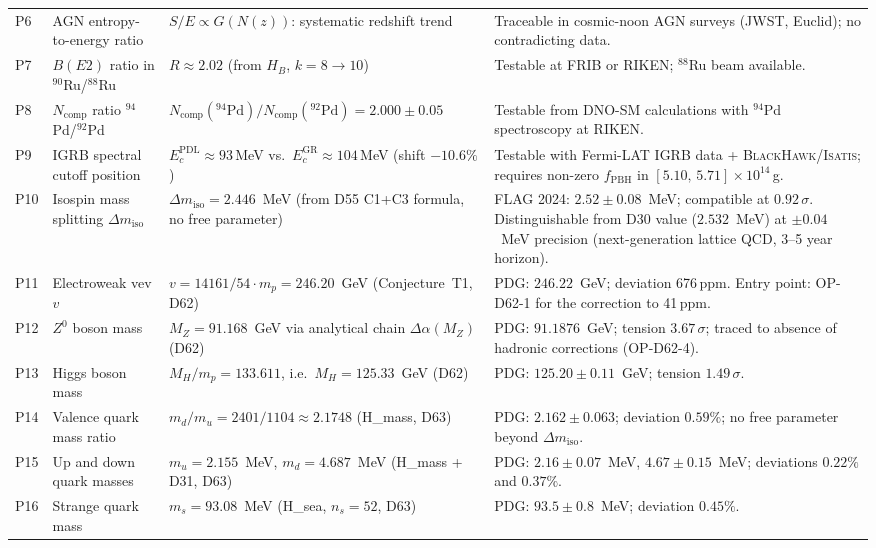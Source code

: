 \documentclass[11pt,a4paper]{article}
\theoremstyle{plain}
\theoremstyle{definition}
\theoremstyle{remark}
\begin{document}
\begin{longtable}{L{0.5cm}L{3.2cm}L{5.2cm}L{4.2cm}}
P6 & AGN entropy-to-energy ratio & $S/E\propto G(N(z))$: systematic redshift trend & Traceable in cosmic-noon AGN surveys (JWST, Euclid); no contradicting data.\\[0.4em]
P7 & $B(E2)$ ratio in $^{90}$Ru/$^{88}$Ru & $R\approx 2.02$ (from $H_B$, $k=8\to10$) & Testable at FRIB or RIKEN; $^{88}$Ru beam available.\\[0.4em]
P8 & $N_{\mathrm{comp}}$ ratio $^{94}$Pd/$^{92}$Pd & $N_{\mathrm{comp}}(^{94}\mathrm{Pd})/N_{\mathrm{comp}}(^{92}\mathrm{Pd})=2.000\pm0.05$ & Testable from DNO-SM calculations with $^{94}$Pd spectroscopy at RIKEN.\\[0.4em]
P9 & IGRB spectral cutoff position & $E_c^{\mathrm{PDL}} \approx 93$\,MeV vs.\ $E_c^{\mathrm{GR}} \approx 104$\,MeV (shift $-10.6\%$) & Testable with Fermi-LAT IGRB data + \textsc{BlackHawk}/\textsc{Isatis}; requires non-zero $f_{\mathrm{PBH}}$ in $[5.10,\,5.71]\times10^{14}$\,g.\\[0.4em]
P10 & Isospin mass splitting $\Delta m_{\mathrm{iso}}$ & $\Delta m_{\mathrm{iso}} = 2.446$~MeV (from D55 C1+C3 formula, no free parameter) & FLAG 2024: $2.52 \pm 0.08$~MeV; compatible at $0.92\,\sigma$. Distinguishable from D30 value ($2.532$~MeV) at $\pm 0.04$~MeV precision (next-generation lattice QCD, 3--5 year horizon).\\[0.4em]
P11 & Electroweak vev $v$ & $v = 14161/54\cdot m_p = 246.20$~GeV (Conjecture~T1, D62) & PDG: $246.22$~GeV; deviation 676\,ppm. Entry point: OP-D62-1 for the correction to 41\,ppm.\\[0.4em]
P12 & $Z^0$ boson mass & $M_Z = 91.168$~GeV via analytical chain $\Delta\alpha(M_Z)$ (D62) & PDG: $91.1876$~GeV; tension $3.67\,\sigma$; traced to absence of hadronic corrections (OP-D62-4).\\[0.4em]
P13 & Higgs boson mass & $M_H/m_p = 133.611$, i.e.\ $M_H = 125.33$~GeV (D62) & PDG: $125.20 \pm 0.11$~GeV; tension $1.49\,\sigma$.\\[0.4em]
P14 & Valence quark mass ratio & $m_d/m_u = 2401/1104 \approx 2.1748$ (H\_mass, D63) & PDG: $2.162 \pm 0.063$; deviation $0.59\%$; no free parameter beyond $\Delta m_{\mathrm{iso}}$.\\[0.4em]
P15 & Up and down quark masses & $m_u = 2.155$~MeV, $m_d = 4.687$~MeV (H\_mass + D31, D63) & PDG: $2.16 \pm 0.07$~MeV, $4.67 \pm 0.15$~MeV; deviations $0.22\%$ and $0.37\%$.\\[0.4em]
P16 & Strange quark mass & $m_s = 93.08$~MeV (H\_sea, $n_s=52$, D63) & PDG: $93.5 \pm 0.8$~MeV; deviation $0.45\%$.\\[0.4em]

\end{longtable}
\end{document}
